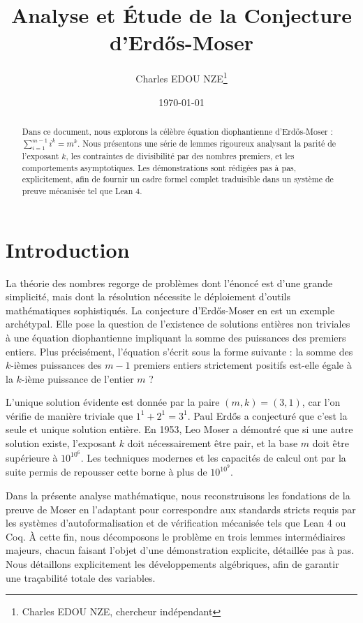 \documentclass[11pt,a4paper,french]{article}
\title{Analyse et Étude de la Conjecture d'Erdős-Moser}
\author{Charles EDOU NZE\thanks{Charles EDOU NZE, chercheur indépendant}}
\date{\today}
\theoremstyle{definition}
\theoremstyle{remark}
\begin{document}
\maketitle

\begin{abstract}
Dans ce document, nous explorons la célèbre équation diophantienne d'Erdős-Moser : $\sum_{i=1}^{m-1} i^k = m^k$. Nous présentons une série de lemmes rigoureux analysant la parité de l'exposant $k$, les contraintes de divisibilité par des nombres premiers, et les comportements asymptotiques. Les démonstrations sont rédigées pas à pas, explicitement, afin de fournir un cadre formel complet traduisible dans un système de preuve mécanisée tel que Lean 4.
\end{abstract}

\tableofcontents
\newpage

\section{Introduction}
\label{sec:intro}
La théorie des nombres regorge de problèmes dont l'énoncé est d'une grande simplicité, mais dont la résolution nécessite le déploiement d'outils mathématiques sophistiqués. La conjecture d'Erdős-Moser en est un exemple archétypal. Elle pose la question de l'existence de solutions entières non triviales à une équation diophantienne impliquant la somme des puissances des premiers entiers. Plus précisément, l'équation s'écrit sous la forme suivante : la somme des $k$-ièmes puissances des $m-1$ premiers entiers strictement positifs est-elle égale à la $k$-ième puissance de l'entier $m$ ?

L'unique solution évidente est donnée par la paire $(m, k) = (3, 1)$, car l'on vérifie de manière triviale que $1^1 + 2^1 = 3^1$. Paul Erdős a conjecturé que c'est la seule et unique solution entière. En 1953, Leo Moser a démontré que si une autre solution existe, l'exposant $k$ doit nécessairement être pair, et la base $m$ doit être supérieure à $10^{10^6}$. Les techniques modernes et les capacités de calcul ont par la suite permis de repousser cette borne à plus de $10^{10^9}$.

Dans la présente analyse mathématique, nous reconstruisons les fondations de la preuve de Moser en l'adaptant pour correspondre aux standards stricts requis par les systèmes d'autoformalisation et de vérification mécanisée tels que Lean 4 ou Coq. À cette fin, nous décomposons le problème en trois lemmes intermédiaires majeurs, chacun faisant l'objet d'une démonstration explicite, détaillée pas à pas. Nous détaillons explicitement les développements algébriques, afin de garantir une traçabilité totale des variables.
\end{document}
